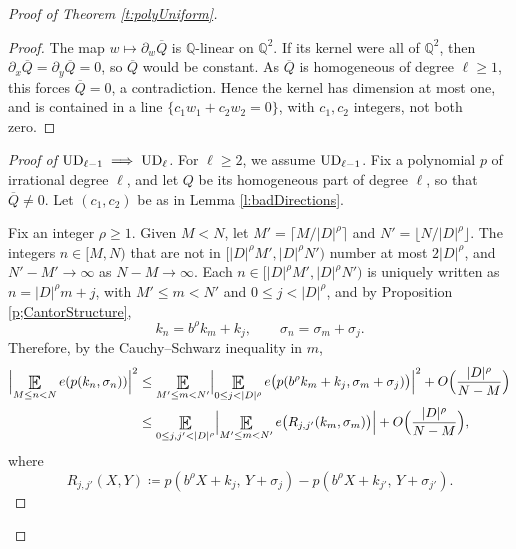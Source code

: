 \begin{proof}[Proof of Theorem \ref{t:polyUniform}]
\begin{proof}
The map $w\mapsto \partial_w\overline Q$ is $\mathbb{Q}$-linear on $\mathbb{Q}^2$. 
If its kernel were all of $\mathbb{Q}^2$, then $\partial_x\overline Q=\partial_y\overline Q=0$, so $\overline Q$ would be constant. 
As $\overline Q$ is homogeneous of degree $\ell\geq1$, this forces $\overline Q=0$, a contradiction. 
Hence the kernel has dimension at most one, and is contained in a line $\{c_1w_1+c_2w_2=0\}$, with $c_1,c_2$ integers, not both zero. 
\end{proof}

\begin{proof}[Proof of $\textup{UD}_{\ell-1} \implies \textup{UD}_\ell$] 
For $\ell\geq 2$, we assume $\textup{UD}_{\ell-1}$. 
Fix a polynomial $p$ of irrational degree $\ell$, and let $Q$ be its homogeneous part of degree $\ell$, so that $\overline Q\neq 0$. 
Let $(c_1,c_2)$ be as in Lemma \ref{l:badDirections}. 

Fix an integer $\rho\geq 1$. 
Given $M<N$, let $M'=\lceil M/\lvert D\rvert^{\rho}\rceil$ and $N'=\lfloor N/\lvert D\rvert^{\rho}\rfloor$. 
The integers $n\in[M,N)$ that are not in $[\lvert D\rvert^{\rho}M',\lvert D\rvert^{\rho}N')$ number at most $2\lvert D\rvert^{\rho}$, and $N'-M'\to\infty$ as $N-M\to\infty$. 
Each $n\in[\lvert D\rvert^{\rho}M',\lvert D\rvert^{\rho}N')$ is uniquely written as $n=\lvert D\rvert^{\rho}m+j$, with $M'\leq m<N'$ and $0\leq j<\lvert D\rvert^{\rho}$, 
and by Proposition \ref{p;CantorStructure}, 
\begin{equation}
k_n=b^{\rho}k_m+k_j, \qquad \sigma_n=\sigma_m+\sigma_j. 
\end{equation}
Therefore, by the Cauchy--Schwarz inequality in $m$, 
\begin{align}
\Bigl\lvert \Expectation_{M\leq n<N}e(p(k_n,\sigma_n))\Bigr\rvert^2
&\leq 
\Expectation_{M'\leq m<N'}\Bigl\lvert \Expectation_{0\leq j<\lvert D\rvert^{\rho}} e\bigl(p(b^{\rho}k_m+k_j,\sigma_m+\sigma_j)\bigr)\Bigr\rvert^2 + O\Bigl(\frac{\lvert D\rvert^{\rho}}{N-M}\Bigr)
\\ \label{e:CSblocks}
&\leq 
\Expectation_{0\leq j,j'<\lvert D\rvert^{\rho}}\Bigl\lvert 
\Expectation_{M'\leq m<N'}e\bigl(R_{j,j'}(k_m,\sigma_m)\bigr)\Bigr\rvert + O\Bigl(\frac{\lvert D\rvert^{\rho}}{N-M}\Bigr), 
\end{align}
where 
\begin{equation}
R_{j,j'}(X,Y)\coloneqq p(b^{\rho}X+k_j,\,Y+\sigma_j)-p(b^{\rho}X+k_{j'},\,Y+\sigma_{j'}). 
\end{equation}


\end{proof}
\end{proof}
